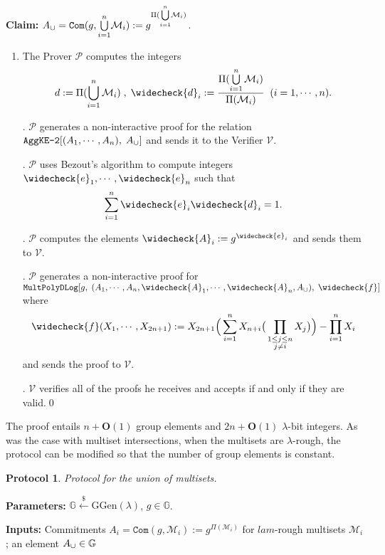 \documentclass[11pt, lettersize, notitlepage, leqno, footskip=0.6cm]{article}
\newcommand{\pl}{\prod\limits}
\newcommand{\slim}{\sum\limits}
\newcommand{\ttt}{\texttt}
\newcommand{\mc}{\mathcal}
\newcommand{\mb}{\mathbb}
\newcommand{\mbf}{\mathbf}
\newcommand{\mr}{\mathrm}
\newcommand{\lam}{\lambda}
\newcommand{\lamb}{\lambda}
\newcommand{\weck}{\widecheck}
\newcommand{\bO}{\mbf{O}}
\newcommand{\mP}{\mc{P}}
\newcommand{\V}{\mc{V}}
\newcommand{\mcM}{\mc{M}}
\newcommand{\vs}{\vspace{-0.15cm}}
\newcommand{\noin}{\noindent}
\newtheorem{Prot}[Thm]{Protocol}
\numberwithin{equation}{section}
\begin{document}
\noin \textbf{Claim:} $A_{\tt{\cup}} = \protect{\verb|Com|}(g, {\bigcup\limits_{i=1}^n} \mc{M}_i) := g^{\Pi({\bigcup\limits_{i=1}^n} \mc{M}_i)}$. \vs

\begin{enumerate}[wide, labelwidth=!, labelindent=0pt]\vs \item The Prover $\mP$ computes the integers \vspace{-0.25cm} $$d:= \Pi(\bigcup\limits_{i=1}^n \mc{M}_i)\;,\;\weck{d}_i:= \frac{\Pi(\bigcup\limits_{i=1}^n \mc{M}_i)}{\Pi(\mcM_i)}\;\;(i=1,\cdots,n).$$

\noin 2. $\mP$ generates a non-interactive proof for the relation $\ttt{AggKE-2}[(A_1,\cdots,A_n),\;A_{\tt{\cup}}]$ and sends it to the Verifier $\V$. 

\noin 3. $\mP$ uses Bezout's algorithm to compute integers $\weck{e}_1,\cdots, \weck{e}_n$ such that \vs $$\slim_{i=1}^n \weck{e}_i\weck{d}_i = 1.$$\vspace{-0.3cm}

\noin 4. $\mP$ computes the elements $\weck{A}_i:= g^{\weck{e}_i}$ and sends them to $\V$.

\noin 5. $\mP$ generates a non-interactive proof for $\ttt{MultPolyDLog}[g,\;(A_1,\cdots,A_n,\weck{A}_1,\cdots,\weck{A}_n,A_{\tt{\cup}}),\; \weck{f}]$ where \vs $$\weck{f}(X_1,\cdots,X_{2n+1}):= X_{2n+1}\Big(\slim_{i=1}^n X_{n+i}\big(\pl_{\substack{1\leq j\leq n\\ j\neq i}} X_{j}\big)\Big) - \pl_{i=1}^n X_i$$ and sends the proof to $\V$.

\noin 6. $\V$ verifies all of the proofs he receives and accepts if and only if they are valid.\qed \end{enumerate}


\noin The proof entails $n+\bO(1)$ group elements and $2n+\bO(1)$ $\lam$-bit integers. As was the case with multiset intersections, when the multisets are $\lam$-rough, the protocol can be modified so that the number of group elements is constant.

\vspace{0.1cm}

\begin{Prot} Protocol for the union of multisets.\end{Prot} \vspace{-0.3cm}

\noin \textbf{Parameters:} $\mb{G}\xleftarrow{\$} \mr{GGen}(\lamb)$,\; $g\in \mb{G}$.

\noin \textbf{Inputs:} Commitments $A_i = \ttt{Com}(g, \mc{M}_i) := g^{\Pi(\mc{M}_i)}$ for $lam$-rough multisets $\mc{M}_i$; an element $A_{\tt{\cup}}\in\mb{G}$
\end{document}
